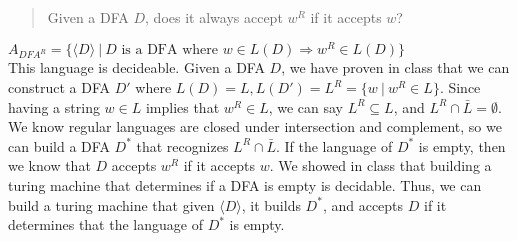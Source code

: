 
\begin{quote}
Given a DFA $D$, does it always accept $w^R$ if it accepts $w$? 	
\end{quote}


\begin{solution}

$A_{DFA^R} = \{\langle D \rangle ~|~ D \mbox{ is a DFA where } w \in L(D) \Longrightarrow w^R\in L(D)\}$\\
This language is decideable. Given a DFA $D$, we have proven in class that we can construct a DFA $D'$ where $L(D) = L, L(D') = L^R = \{w ~|~ w^R \in L\}$. Since having a string $w \in L$ implies that $w^R\in L$, we can say $L^R \subseteq L$, and $L^R \cap \bar{L} = \emptyset$. We know regular languages are closed under intersection and complement, so we can build a DFA $D^*$ that recognizes $L^R \cap \bar{L}$. If the language of $D^*$ is empty, then we know that $D$ accepts $w^R$ if it accepts $w$. We showed in class that building a turing machine that determines if a DFA is empty is decidable. Thus, we can build a turing machine that given $\langle D \rangle$, it builds $D^*$, and accepts $D$ if it determines that the language of $D^*$ is empty.

\end{solution}
